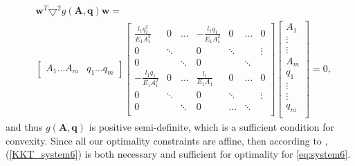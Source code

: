 \begin{align*}
&\bm{w}^T\bm{\bigtriangledown}^2 g(\bm{A},\bm{q})\bm{w} = \\
&\begin{bmatrix}
A_1 \hdots A_m & q_1 \hdots q_m
\end{bmatrix}
\begin{bmatrix}
\frac{l_1q_1^2}{E_1A_1^3} & 0 & \hdots  & -\frac{l_1q_1}{E_1A_1^2} & 0 & \hdots  & 0 \\[0.3em]
0 & \ddots &  & 0 & \ddots &  & \vdots\\[0.3em]
0 &  & \ddots &  0 &  & \ddots\\[0.3em]
-\frac{l_1q_1}{E_1A_1^2} & 0 & \hdots & \frac{l_1}{E_1A_1}  & 0 & \hdots & 0\\[0.3em]
0 & \ddots &  & 0 & \ddots & & \vdots \\[0.3em]
0 &  & \ddots & 0 & \hdots & \ddots \\[0.3em]
\end{bmatrix}
\begin{bmatrix}
A_1 \\
\vdots\\
\vdots\\
A_m\\
q_1\\
\vdots\\
\vdots\\
q_m\\
\end{bmatrix} = 0,
\end{align*}
and thus $g(\bm{A},\bm{q})$ is positive semi-definite, which is a sufficient condition for convexity. Since all our optimality constraints are affine, then according to \cite{KKT_suff}, (\ref{KKT_system6}) is both necessary and sufficient for optimality for \eqref{eq:system6}.




